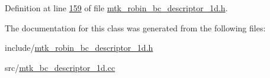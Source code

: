 Definition at line \hyperlink{mtk__robin__bc__descriptor__1d_8h_source_l00159}{159} of file \hyperlink{mtk__robin__bc__descriptor__1d_8h_source}{mtk\+\_\+robin\+\_\+bc\+\_\+descriptor\+\_\+1d.\+h}.



The documentation for this class was generated from the following files\+:\begin{DoxyCompactItemize}
\item 
include/\hyperlink{mtk__robin__bc__descriptor__1d_8h}{mtk\+\_\+robin\+\_\+bc\+\_\+descriptor\+\_\+1d.\+h}\item 
src/\hyperlink{mtk__bc__descriptor__1d_8cc}{mtk\+\_\+bc\+\_\+descriptor\+\_\+1d.\+cc}\end{DoxyCompactItemize}
